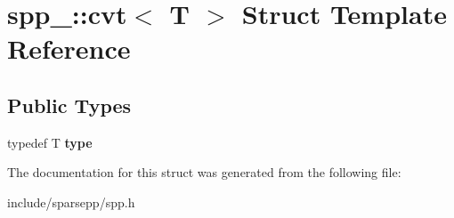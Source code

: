 \hypertarget{structspp___1_1cvt}{}\section{spp\+\_\+\+:\+:cvt$<$ T $>$ Struct Template Reference}
\label{structspp___1_1cvt}
\subsection*{Public Types}
\begin{DoxyCompactItemize}
\item 
typedef T {\bfseries type}\hypertarget{structspp___1_1cvt_ab1e5231bc81a76479673ec6e5ff7d187}{}\label{structspp___1_1cvt_ab1e5231bc81a76479673ec6e5ff7d187}

\end{DoxyCompactItemize}


The documentation for this struct was generated from the following file\+:\begin{DoxyCompactItemize}
\item 
include/sparsepp/spp.\+h\end{DoxyCompactItemize}
